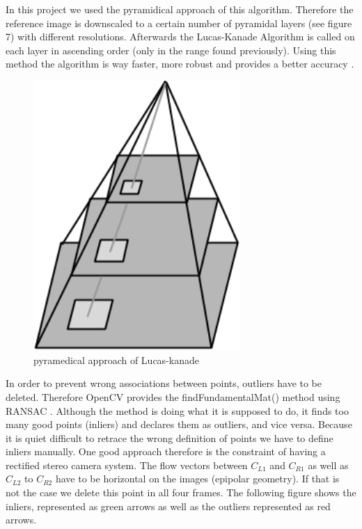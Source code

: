 \documentclass[11pt]{article}
\begin{document}
	In this project we used the pyramidical approach of this algorithm. Therefore the reference image is downscaled to a certain number of pyramidal layers (see figure 7) with different resolutions. Afterwards the Lucas-Kanade Algorithm is called on each layer in ascending order (only in the range found previously). Using this method the algorithm is way faster, more robust and provides a better accuracy \cite{Lucas_Kanade_TU_dresden}.

	\begin{figure}[H]
		\centering
		\includegraphics[width=0.7\textwidth]{images/pyramidical.png}
		\caption{pyramedical approach of Lucas-kanade}
	\end{figure}
	
	In order to prevent wrong associations between points, outliers have to be deleted. Therefore OpenCV provides the findFundamentalMat() method using RANSAC \cite{findFundamentalMat}. Although the method is doing what it is supposed to do, it finds too many good points (inliers) and declares them as outliers, and vice versa. Because it is quiet difficult to retrace the wrong definition of points we have to define inliers manually. One good approach therefore is the constraint of having a rectified stereo camera system. The flow vectors between $C_{L1}$ and $C_{R1}$ as well as $C_{L2}$ to $C_{R2}$ have to be horizontal on the images (epipolar geometry). If that is not the case we delete this point in all four frames. The following figure shows the inliers, represented as green arrows as well as the outliers represented as red arrows.
	
\end{document}
